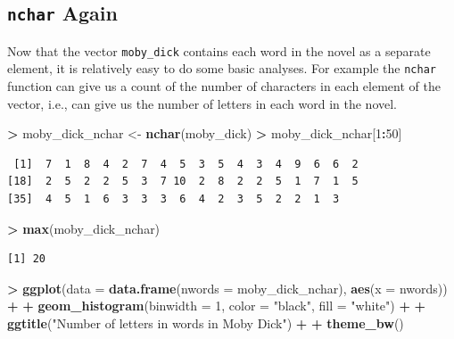 \documentclass[]{krantz}
\makeatletter
\newenvironment{Shaded}{\begin{snugshade}}{\end{snugshade}}
\newcommand{\KeywordTok}[1]{\textcolor[rgb]{0.27,0.27,0.27}{\textbf{#1}}}
\newcommand{\DataTypeTok}[1]{\textcolor[rgb]{0.27,0.27,0.27}{#1}}
\newcommand{\DecValTok}[1]{\textcolor[rgb]{0.06,0.06,0.06}{#1}}
\newcommand{\StringTok}[1]{\textcolor[rgb]{0.5,0.5,0.5}{#1}}
\newcommand{\OperatorTok}[1]{\textcolor[rgb]{0.43,0.43,0.43}{\textbf{#1}}}
\newcommand{\NormalTok}[1]{#1}
\newenvironment{kframe}{%
\medskip{}
\setlength{\fboxsep}{.8em}
 \def\at@end@of@kframe{}%
 \ifinner\ifhmode%
  \def\at@end@of@kframe{\end{minipage}}%
  \begin{minipage}{\columnwidth}%
 \fi\fi%
 \def\FrameCommand##1{\hskip\@totalleftmargin \hskip-\fboxsep
 \colorbox{shadecolor}{##1}\hskip-\fboxsep
     \hskip-\linewidth \hskip-\@totalleftmargin \hskip\columnwidth}%
 \MakeFramed {\advance\hsize-\width
   \@totalleftmargin\z@ \linewidth\hsize
   \@setminipage}}%
 {\par\unskip\endMakeFramed%
 \at@end@of@kframe}
\renewenvironment{Shaded}{\begin{kframe}}{\end{kframe}}
\makeatother
\begin{document}
\subsection{\texorpdfstring{\texttt{nchar}
Again}{nchar Again}}\label{nchar-again}

Now that the vector \texttt{moby\_dick} contains each word in the novel
as a separate element, it is relatively easy to do some basic analyses.
For example the \texttt{nchar} function can give us a count of the
number of characters in each element of the vector, i.e., can give us
the number of letters in each word in the novel.

\begin{Shaded}
\begin{Highlighting}[]
\OperatorTok{>}\StringTok{ }\NormalTok{moby_dick_nchar <-}\StringTok{ }\KeywordTok{nchar}\NormalTok{(moby_dick)}
\OperatorTok{>}\StringTok{ }\NormalTok{moby_dick_nchar[}\DecValTok{1}\OperatorTok{:}\DecValTok{50}\NormalTok{]}
\end{Highlighting}
\end{Shaded}

\begin{verbatim}
 [1]  7  1  8  4  2  7  4  5  3  5  4  3  4  9  6  6  2
[18]  2  5  2  2  5  3  7 10  2  8  2  2  5  1  7  1  5
[35]  4  5  1  6  3  3  3  6  4  2  3  5  2  2  1  3
\end{verbatim}

\begin{Shaded}
\begin{Highlighting}[]
\OperatorTok{>}\StringTok{ }\KeywordTok{max}\NormalTok{(moby_dick_nchar)}
\end{Highlighting}
\end{Shaded}

\begin{verbatim}
[1] 20
\end{verbatim}

\begin{Shaded}
\begin{Highlighting}[]
\OperatorTok{>}\StringTok{ }\KeywordTok{ggplot}\NormalTok{(}\DataTypeTok{data =} \KeywordTok{data.frame}\NormalTok{(}\DataTypeTok{nwords =}\NormalTok{ moby_dick_nchar), }\KeywordTok{aes}\NormalTok{(}\DataTypeTok{x =}\NormalTok{ nwords)) }\OperatorTok{+}\StringTok{ }
\OperatorTok{+}\StringTok{   }\KeywordTok{geom_histogram}\NormalTok{(}\DataTypeTok{binwidth =} \DecValTok{1}\NormalTok{, }\DataTypeTok{color =} \StringTok{"black"}\NormalTok{, }\DataTypeTok{fill =} \StringTok{"white"}\NormalTok{) }\OperatorTok{+}\StringTok{ }
\OperatorTok{+}\StringTok{   }\KeywordTok{ggtitle}\NormalTok{(}\StringTok{"Number of letters in words in Moby Dick"}\NormalTok{) }\OperatorTok{+}\StringTok{ }
\OperatorTok{+}\StringTok{   }\KeywordTok{theme_bw}\NormalTok{()}
\end{Highlighting}
\end{Shaded}
\end{document}
